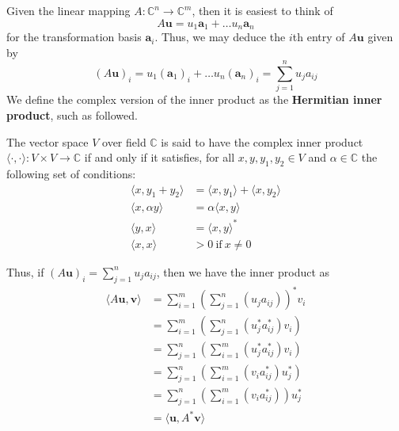 Given the linear mapping $A:\mathbb{C}^{n}\to \mathbb{C}^{m}$, then it is easiest to think of 
\begin{equation}
    A\mathbf{u} = u_{1} \mathbf{a}_{1} + \dots u_{n}\mathbf{a}_{n}
\end{equation}
for the transformation basis $\mathbf{a}_{i}$. Thus, we may deduce the $i$th entry of $A\mathbf{u}$ given by 
\begin{equation}
    (A\mathbf{u})_{i} = u_{1}(\mathbf{a}_{1})_{i}+ \dots u_{n}(\mathbf{a}_{n})_{i} = \sum^{n}_{j=1}u_{j}a_{ij}
\end{equation}
We define the complex version of the inner product as the \textbf{Hermitian inner product}, such as followed. 
\begin{definition}
    The vector space $V$ over field $\mathbb{C}$ is said to have the complex inner product $\langle\cdot,\cdot\rangle:V\times V\to \mathbb{C}$ if and only if it satisfies, for all $x,y,y_{1},y_{2}\in V$ and $\alpha\in \mathbb{C}$ the following set of conditions:
    \begin{align}
        \langle x, y_{1}+y_{2}\rangle &= \langle x,y_{1}\rangle + \langle x, y_{2}\rangle \\
        \langle x, \alpha y\rangle & = \alpha \langle x,y \rangle\\
        \langle y, x \rangle &= \langle x,y\rangle^{*}\\
        \langle x, x \rangle &> 0 \: \text{if}\: x\ne 0
    \end{align}
\end{definition}

Thus, if $(A\mathbf{u})_{i} =\sum^{n}_{j=1}u_{j}a_{ij}$, then we have the inner product as 
\begin{equation}
    \begin{split}
        \langle A\mathbf{u},\mathbf{v} \rangle 
        & = \sum^{m}_{i=1} \left(\sum^{n}_{j=1}(u_{j}a_{ij})\right)^{*}v_{i}\\
        & = \sum^{m}_{i=1} \left(\sum^{n}_{j=1}(u_{j}^{*}a_{ij}^{*})v_{i}\right)\\
        & = \sum^{n}_{j=1}\left(\sum^{m}_{i=1}(u_{j}^{*}a_{ij}^{*})v_{i}\right)\\
        & = \sum^{n}_{j=1}\left(\sum^{m}_{i=1}(v_{i}a_{ij}^{*})u^{*}_{j}\right)\\
        & = \sum^{n}_{j=1}\left(\sum^{m}_{i=1}(v_{i}a_{ij}^{*})\right)u^{*}_{j} \\
        & = \langle \mathbf{u}, A^{*}\mathbf{v}\rangle
    \end{split}
\end{equation}

